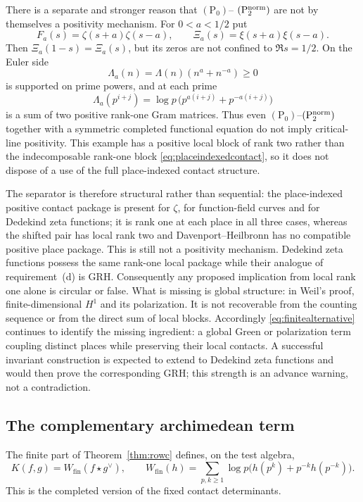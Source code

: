 \documentclass[11pt]{amsart}
\theoremstyle{definition}
\theoremstyle{remark}
\begin{document}
There is a separate and stronger reason that $\mathrm{(P_0)}$--
$\mathrm{(P_2^{\rm norm})}$ are not by themselves a positivity mechanism.  For
$0<a<1/2$ put
\[
 F_a(s)=\zeta(s+a)\zeta(s-a),\qquad
 \Xi_a(s)=\xi(s+a)\xi(s-a).
\]
Then $\Xi_a(1-s)=\Xi_a(s)$, but its zeros are not confined to
$\Re s=1/2$.  On the Euler side
\[
 \Lambda_a(n)=\Lambda(n)(n^a+n^{-a})\ge0
\]
is supported on prime powers, and at each prime
\[
 \Lambda_a(p^{i+j})=\log p\,
 \bigl(p^{a(i+j)}+p^{-a(i+j)}\bigr)
\]
is a sum of two positive rank-one Gram matrices.  Thus even
$\mathrm{(P_0)}$--$\mathrm{(P_2^{\rm norm})}$ together with a symmetric
completed functional equation do not imply critical-line positivity.  This
example has a positive local block of rank two rather than the indecomposable
rank-one block \eqref{eq:placeindexedcontact}, so it does not dispose of a
use of the full place-indexed contact structure.

The separator is therefore structural rather than sequential:
the place-indexed positive contact package is present for $\zeta$, for
function-field curves and for Dedekind zeta functions; it is rank one at
each place in all three cases, whereas the shifted pair has local rank two
and Davenport--Heilbronn has no compatible positive place package.  This is
still not a positivity mechanism.  Dedekind zeta functions possess the same
rank-one local package while their analogue of requirement~(d) is GRH.  Consequently
any proposed implication from local rank one alone is circular or false.
What is missing is global structure: in Weil's proof, finite-dimensional
$H^1$ and its polarization.  It is not recoverable from the counting
sequence or from the direct sum of local blocks.  Accordingly
\eqref{eq:finitealternative} continues to identify the missing ingredient:
a global Green or polarization term coupling distinct places while
preserving their local contacts.  A successful invariant construction is
expected to extend to Dedekind zeta functions and would then prove the
corresponding GRH; this strength is an advance warning, not a contradiction.

\subsection{The complementary archimedean term}

The finite part of Theorem~\ref{thm:rowc} defines, on the test algebra,
\begin{equation}\label{eq:Ktest}
 K(f,g)=W_{\mathrm{fin}}(f\star g^\vee),\qquad
 W_{\mathrm{fin}}(h)=\sum_{p,k\ge1}\log p
 \bigl(h(p^k)+p^{-k}h(p^{-k})\bigr).
\end{equation}
This is the completed version of the fixed contact determinants.
\end{document}
